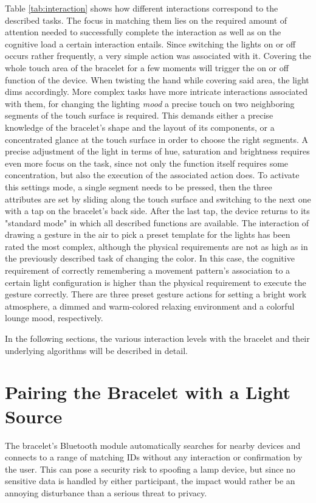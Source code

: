 Table \ref{tab:interaction} shows how different interactions correspond to the described tasks. The focus in matching them lies on the required amount of attention needed to successfully complete the interaction as well as on the cognitive load a certain interaction entails. Since switching the lights on or off occurs rather frequently, a very simple action was associated with it. Covering the whole touch area of the bracelet for a few moments will trigger the on or off function of the device. When twisting the hand while covering said area, the light dims accordingly. More complex tasks have more intricate interactions associated with them, for changing the lighting \textit{mood} a precise touch on two neighboring segments of the touch surface is required. This demands either a precise knowledge of the bracelet's shape and the layout of its components, or a concentrated glance at the touch surface in order to choose the right segments. A precise adjustment of the light in terms of hue, saturation and brightness requires even more focus on the task, since not only the function itself requires some concentration, but also the execution of the associated action does. To activate this settings mode, a single segment needs to be pressed, then the three attributes are set by sliding along the touch surface and switching to the next one with a tap on the bracelet's back side. After the last tap, the device returns to its "standard mode" in which all described functions are available. The interaction of drawing a gesture in the air to pick a preset template for the lights has been rated the most complex, although the physical requirements are not as high as in the previously described task of changing the color. In this case, the cognitive requirement of correctly remembering a movement pattern's association to a certain light configuration is higher than the physical requirement to execute the gesture correctly. There are three preset gesture actions for setting a bright work atmosphere, a dimmed and warm-colored relaxing environment and a colorful lounge mood, respectively.

In the following sections, the various interaction levels with the bracelet and their underlying algorithms will be described in detail.

\section{Pairing the Bracelet with a Light Source}
The bracelet's Bluetooth module automatically searches for nearby devices and connects to a range of matching IDs without any interaction or confirmation by the user. This can pose a security risk to spoofing a lamp device, but since no sensitive data is handled by either participant, the impact would rather be an annoying disturbance than a serious threat to privacy.

